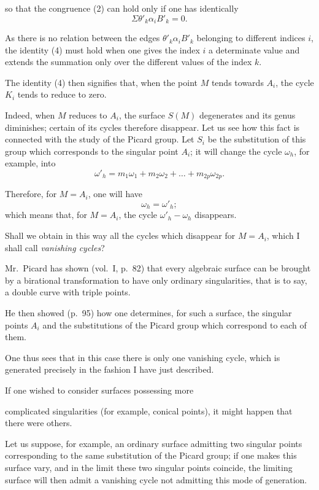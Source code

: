 \documentclass{article}
\begin{document}
so that the congruence (2) can hold only if one has identically
\[ \Sigma \theta'_{k} \alpha_{i}B'_{k} = 0. \tag{4} \]

As there is no relation between the edges $\theta'_{k} \alpha_{i}B'_{k}$ belonging to different indices $i$, the identity (4) must hold when one gives the index $i$ a determinate value and extends the summation only over the different values of the index $k$.

The identity (4) then signifies that, when the point $M$ tends towards $A_{i}$, the cycle $K_{i}$ tends to reduce to zero.

Indeed, when $M$ reduces to $A_{i}$, the surface $S(M)$ degenerates and its genus diminishes; certain of its cycles therefore disappear. Let us see how this fact is connected with the study of the Picard group. Let $S_{i}$ be the substitution of this group which corresponds to the singular point $A_{i}$; it will change the cycle $\omega_{h}$, for example, into
\[ \omega'_{h} = m_{1}\omega_{1} + m_{2}\omega_{2} + \ldots + m_{2p}\omega_{2p}. \]

Therefore, for $M = A_{i}$, one will have
\[ \omega_{h} = \omega'_{h}; \]
which means that, for $M = A_{i}$, the cycle $\omega'_{h} - \omega_{h}$ disappears.

Shall we obtain in this way all the cycles which disappear for $M = A_{i}$, which I shall call \emph{vanishing cycles}?

Mr.~Picard has shown (vol.\ I, p.\ 82) that every algebraic surface can be brought by a birational transformation to have only ordinary singularities, that is to say, a double curve with triple points.

He then showed (p.\ 95) how one determines, for such a surface, the singular points $A_{i}$ and the substitutions of the Picard group which correspond to each of them.

One thus sees that in this case there is only one vanishing cycle, which is generated precisely in the fashion I have just described.

If one wished to consider surfaces possessing more

complicated singularities (for example, conical points), it might happen that there were others.

Let us suppose, for example, an ordinary surface admitting two singular points corresponding to the same substitution of the Picard group; if one makes this surface vary, and in the limit these two singular points coincide, the limiting surface will then admit a vanishing cycle not admitting this mode of generation.
\end{document}
